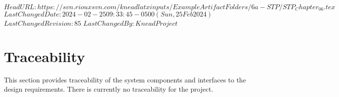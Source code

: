 \svnidlong
{$HeadURL: https://svn.riouxsvn.com/kneadlatxinputs/ExampleArtifactFolders/6a-STP/STP_Chapter_06.tex $}
{$LastChangedDate: 2024-02-25 09:33:45 -0500 (Sun, 25 Feb 2024) $}
{$LastChangedRevision: 85 $}
{$LastChangedBy: KneadProject $}

\chapter{Traceability}
\label{loc:Traceability}
% 

This section provides traceability of the system components and interfaces to the design requirements. There is currently no traceability for the \ThisSystem project.


